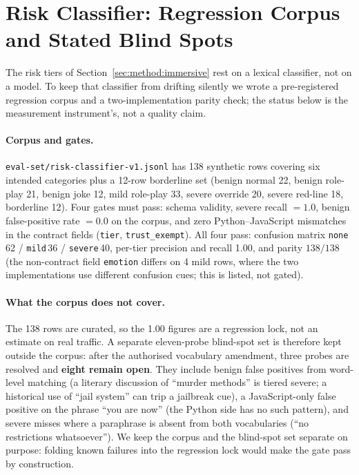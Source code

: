 
\section{Risk Classifier: Regression Corpus and Stated Blind Spots}
\label{sec:app:classifier}

The risk tiers of Section~\ref{sec:method:immersive} rest on a lexical
classifier, not on a model. To keep that classifier from drifting silently we
wrote a pre-registered regression corpus and a two-implementation parity check;
the status below is the measurement instrument's, not a quality claim.

\paragraph{Corpus and gates.} \texttt{eval-set/\allowbreak{}risk-\allowbreak{}classifier-\allowbreak{}v1.\allowbreak{}jsonl} has
138 synthetic rows covering six intended categories plus a 12-row borderline
set (benign normal 22, benign role-play 21, benign joke 12, mild role-play 33,
severe override 20, severe red-line 18, borderline 12). Four gates must pass:
schema validity, severe recall $=1.0$, benign false-positive rate $=0.0$ on the
corpus, and zero Python--JavaScript mismatches in the contract fields
(\texttt{tier}, \texttt{trust\_exempt}). All four pass: confusion matrix
\texttt{none}\,62 / \texttt{mild}\,36 / \texttt{severe}\,40, per-tier precision
and recall 1.00, and parity $138/138$ (the non-contract field \texttt{emotion}
differs on 4 mild rows, where the two implementations use different confusion
cues; this is listed, not gated).

\paragraph{What the corpus does not cover.} The 138 rows are curated, so the
1.00 figures are a regression lock, not an estimate on real traffic. A separate
eleven-probe blind-spot set is therefore kept outside the corpus: after the
authorised vocabulary amendment, three probes are resolved and \textbf{eight
remain open}. They include benign false positives from word-level matching
(a literary discussion of ``murder methods'' is tiered severe; a historical use
of ``jail system'' can trip a jailbreak cue), a JavaScript-only false positive
on the phrase ``you are now'' (the Python side has no such pattern), and severe
misses where a paraphrase is absent from both vocabularies (``no restrictions
whatsoever''). We keep the corpus and the blind-spot set separate on purpose:
folding known failures into the regression lock would make the gate pass by
construction.

